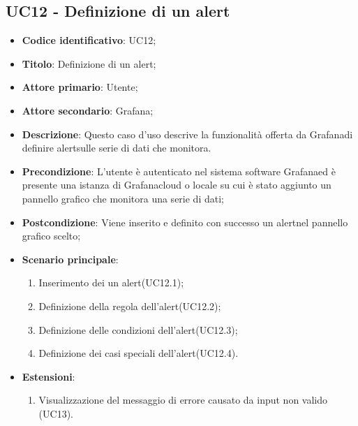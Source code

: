 \subsection{UC12 - Definizione di un alert}
\begin{itemize}
	\item \textbf{Codice identificativo}: UC12;
	\item \textbf{Titolo}: Definizione di un alert\glo;
	\item \textbf{Attore primario}: Utente;
	\item \textbf{Attore secondario}: Grafana\glo;
	\item \textbf{Descrizione}: Questo caso d'uso descrive la funzionalità offerta da Grafana\glosp di definire alert\glosp sulle serie di dati che monitora.
	\item \textbf{Precondizione}: L'utente è autenticato nel sistema software Grafana\glosp ed è presente una istanza di Grafana\glosp cloud o locale su cui è stato aggiunto un pannello grafico che monitora una serie di dati;
	\item \textbf{Postcondizione}: Viene inserito e definito con successo un alert\glosp nel pannello grafico scelto;
	\item \textbf{Scenario principale}: 
	\begin{enumerate}
		\item Inserimento dei un alert\glosp (UC12.1);
		\item Definizione della regola dell'alert\glosp (UC12.2);
		\item Definizione delle condizioni dell'alert\glosp (UC12.3);
		\item Definizione dei casi speciali dell'alert\glosp (UC12.4).
	\end{enumerate}

	\item \textbf{Estensioni}:	
	\begin{enumerate}
		\item Visualizzazione del messaggio di errore causato da input non valido (UC13).
	\end{enumerate}
\end{itemize}

